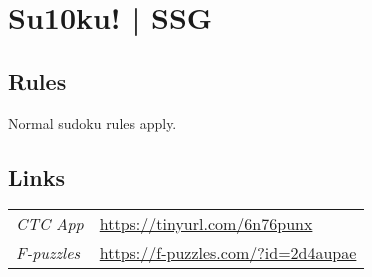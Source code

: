 \section{Su10ku! | {\normalfont SSG}}
\label{sec:28-su10ku-ssg}

\subsection*{Rules}
\begin{markdown}
Normal sudoku rules apply.
\end{markdown}
\subsection*{Links}
\begin{tabularx}{\textwidth}{l X}
\emph{CTC App} & \url{https://tinyurl.com/6n76punx} \\
\emph{F-puzzles} & \url{https://f-puzzles.com/?id=2d4aupae} \\
\end{tabularx}
\pagebreak
